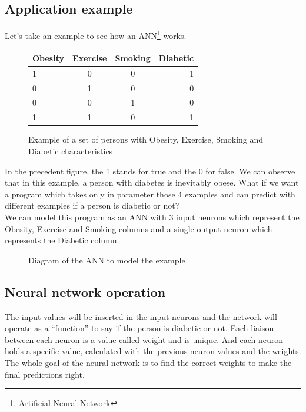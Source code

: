\documentclass[]{report}
\begin{document}
\subsection{Application example}

{Let's take an example to see how an ANN\footnote{Artificial Neural Network} works.}

\begin{figure}[H]
    \centering
    \begin{tabular}{|l|c|c|r|}
      \hline
      Obesity & Exercise & Smoking & Diabetic \\
      \hline
      1 & 0 & 0 & 1 \\
      0 & 1 & 0 & 0 \\
      0 & 0 & 1 & 0 \\
      1 & 1 & 0 & 1 \\
      \hline
    \end{tabular}
    \caption{Example of a set of persons with Obesity, Exercise, Smoking and Diabetic characteristics}
\end{figure}

{In the precedent figure, the 1 stands for true and the 0 for false. We can observe that in this example, a person with diabetes is inevitably obese. What if we want a program which takes only in parameter those 4 examples and can predict with different examples if a person is diabetic or not?}\\

{We can model this program as an ANN with 3 input neurons which represent the Obesity, Exercise and Smoking columns and a single output neuron which represents
the Diabetic column.}

\begin{figure}[H]
    \centering
    \begin{neuralnetwork}[height=3, nodespacing=15mm]
        \outputlayer[count=1, title=Output layer]
        \linklayers
    \end{neuralnetwork}
    \caption{Diagram of the ANN to model the example}
\end{figure}

\subsection{Neural network operation}
\label{subsec:operation}

{The input values will be inserted in the input neurons and the network will operate as a “function” to say if the person is diabetic or not. Each liaison between each neuron is a value called weight and
is unique. And each neuron holds a specific value, calculated with the previous neuron values and the
weights. The whole goal of the neural network is to find the correct weights to make the final predictions
right.}\\
\end{document}

